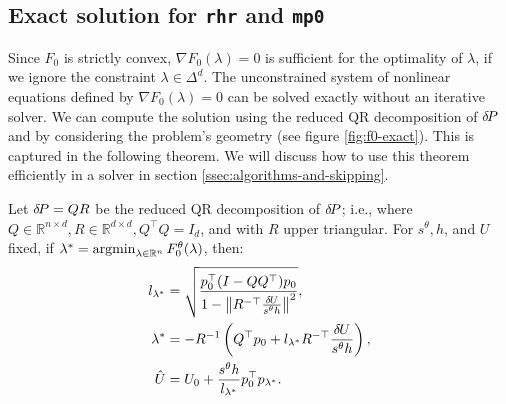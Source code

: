 \documentclass[smallcondensed]{svjour3}
\begin{document}

\subsection{Exact solution for \texttt{rhr} and \texttt{mp0}}\label{ssec:exact-soln}

Since $F_0$ is strictly convex, $\nabla F_0(\lambda) = 0$ is
sufficient for the optimality of $\lambda$, if we ignore the
constraint $\lambda \in \Delta^d$. The unconstrained system of
nonlinear equations defined by $\nabla F_0(\lambda) = 0$ can be solved
exactly without an iterative solver. We can compute the solution using
the reduced QR decomposition of ${\delta \hspace{-0.14em} P}$ and by considering the
problem's geometry (see figure \ref{fig:f0-exact}). This is captured
in the following theorem. We will discuss how to use this theorem
efficiently in a solver in section\@
\ref{ssec:algorithms-and-skipping}.

\begin{theorem}\label{thm:f0-exact}
  Let ${\delta \hspace{-0.14em} P} = QR$ be the reduced QR decomposition of ${\delta \hspace{-0.14em} P}$; i.e.,
  where
  $Q \in \mathbb{R}^{n \times d}, R \in \mathbb{R}^{d \times d},
  Q^\top Q = I_d$, and with $R$ upper triangular. For $s^\theta, h$,
  and $U$ fixed, if
  $\lambda^* = \operatorname{argmin}_{\lambda \in \mathbb{R}^n}
  F_0^\theta(\lambda)$, then:
  \begin{align}
    l_{\lambda^*} &= \sqrt{\frac{p_0^\top {(I - QQ^\top)} p_0}{1 - \left\|R^{-\top} \frac{{\delta \hspace{-0.09em} U}}{s^\theta h}\right\|^2}},\label{eq:l-star-expression} \\
    \lambda^* &= -R^{-1} \left(Q^\top p_0 + l_{\lambda^*} R^{-\top} \frac{{\delta \hspace{-0.09em} U}}{s^\theta h}\right),\label{eq:f0-exact-lambda} \\
    \hat{U} &= U_0 + \frac{s^\theta h}{l_{\lambda^*}} p_0^\top p_{\lambda^*}.\label{eq:f0-exact}
  \end{align}
\end{theorem}
\end{document}
